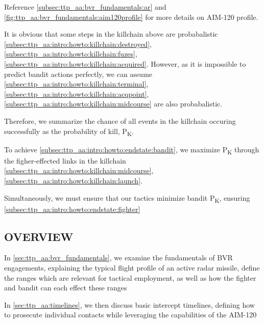 \begin{tcoloritemize}
    Reference \cref{subsec:ttp_aa:bvr_fundamentals:ar} and \cref{fig:ttp_aa:bvr_fundamentals:aim120profile}
    for more details on AIM-120 profile.

    It is obvious that some steps in the killchain above are probabalistic 
    \ref{subsec:ttp_aa:intro:howto:killchain:destroyed},
    \ref{subsec:ttp_aa:intro:howto:killchain:fuzes},
    \ref{subsec:ttp_aa:intro:howto:killchain:acquired}.
    However, as it is impossible to predict bandit actions perfectly, 
    we can assume 
    \ref{subsec:ttp_aa:intro:howto:killchain:terminal},
    \ref{subsec:ttp_aa:intro:howto:killchain:acqpoint},
    \ref{subsec:ttp_aa:intro:howto:killchain:midcourse}
    are also probabalistic.

    \medskip
    Therefore, we summarize the chance of all events in the killchain occuring successfully 
    as the probability of kill, P\textsubscript{K}.

    To achieve \ref{subsec:ttp_aa:intro:howto:endstate:bandit},
    we maximize P\textsubscript{K} through the figher-effected links in the killchain
    \ref{subsec:ttp_aa:intro:howto:killchain:midcourse},
    \ref{subsec:ttp_aa:intro:howto:killchain:launch}.

    \medskip
    Simultaneously, we must ensure that our tactics minimize bandit P\textsubscript{K}, 
    ensuring \ref{subsec:ttp_aa:intro:howto:endstate:fighter}
\end{tcoloritemize}

\subsection{OVERVIEW}
\begin{tcoloritemize}
    \blueitem[Fundamentals] 
    In \cref{sec:ttp_aa:bvr_fundamentals}, 
    we examine the fundamentals of BVR engagements, 
    explaining the typical flight profile of an active radar missile,
    define the ranges which are relevant for tactical employment,
    as well as how the fighter and bandit can each effect these ranges

    In \cref{sec:ttp_aa:timelines}, 
    we then discuss basic intercept timelines, 
    defining how to prosecute individual contacts while leveraging the capabilities of the AIM-120


\end{tcoloritemize}

\clearpage


